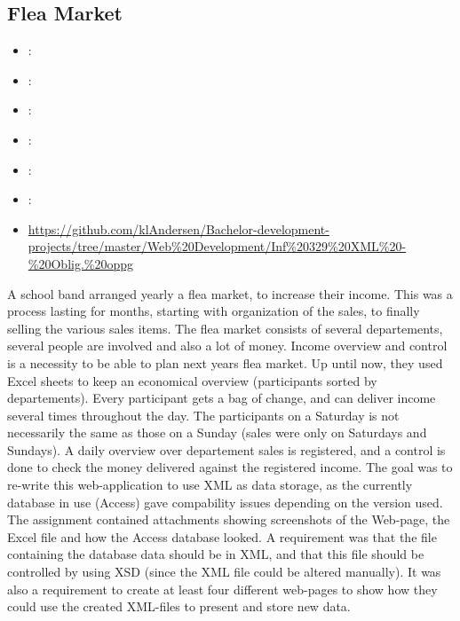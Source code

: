 \subsection{Flea Market}
\label{sec:flea_market}
\begin{itemize} 
	\item {}: 
	\item {}: 
	\item {}: 
	\item {}: 
	\item {}: 
	\item {}: 
	\item {} \url{https://github.com/klAndersen/Bachelor-development-projects/tree/master/Web%20Development/Inf%20329%20XML%20-%20Oblig.%20oppg}
\end{itemize} 
A school band arranged yearly a flea market, to increase their income. 
This was a process lasting for months, starting with organization of the sales, to finally selling the various sales items. 
The flea market consists of several departements, several people are involved and also a lot of money.
Income overview and control is a necessity to be able to plan next years flea market. 
Up until now, they used Excel sheets to keep an economical overview (participants sorted by departements).
Every participant gets a bag of change, and can deliver income several times throughout the day.
The participants on a Saturday is not necessarily the same as those on a Sunday (sales were only on Saturdays and Sundays). 
A daily overview over departement sales is registered, and a control is done to check the money delivered against the registered income.
\vspace{0.5em}\newline
The goal was to re-write this web-application to use XML as data storage, as the currently database in use (Access) gave compability issues depending on the version used. 
The assignment contained attachments showing screenshots of the Web-page, the Excel file and how the Access database looked. 
A requirement was that the file containing the database data should be in XML, and that this file should be controlled by using XSD (since the XML file could be altered manually).
It was also a requirement to create at least four different web-pages to show how they could use the created XML-files to present and store new data.

